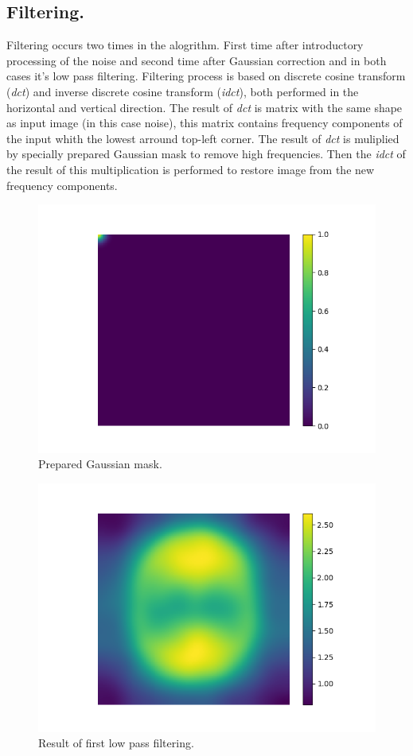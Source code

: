 \subsection*{Filtering.}
Filtering occurs two times in the  alogrithm. First time after introductory processing of the noise and second time after Gaussian correction and in both cases it's low pass filtering. Filtering process is based on discrete cosine transform (\textit{dct}) and inverse discrete cosine transform (\textit{idct}), both performed in the horizontal and vertical direction. The result of \textit{dct} is matrix with the same shape as input image (in this case noise), this matrix contains frequency components of the input whith the lowest arround top-left corner. The result of \textit{dct} is muliplied by specially prepared Gaussian mask to remove high frequencies. Then the \textit{idct} of the result of this multiplication is performed to restore image from the new frequency components.
\begin{figure}[H]
	\centering{}
		\includegraphics[scale=0.7]{figures/module03/70_gauss}
	\caption{Prepared Gaussian mask.} 
\end{figure}
\begin{figure}[H]
	\centering{}
		\includegraphics[scale=0.7]{figures/module03/70_lpf}
	\caption{Result of first low pass filtering.} 
\end{figure}
